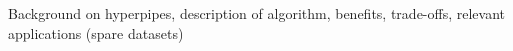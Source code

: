Background on hyperpipes, description of algorithm, benefits, trade-offs, relevant applications (spare datasets)
